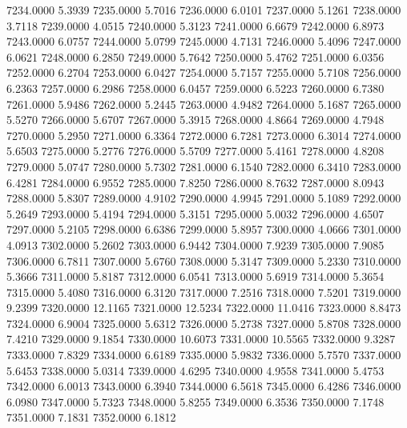 7234.0000      5.3939
7235.0000      5.7016
7236.0000      6.0101
7237.0000      5.1261
7238.0000      3.7118
7239.0000      4.0515
7240.0000      5.3123
7241.0000      6.6679
7242.0000      6.8973
7243.0000      6.0757
7244.0000      5.0799
7245.0000      4.7131
7246.0000      5.4096
7247.0000      6.0621
7248.0000      6.2850
7249.0000      5.7642
7250.0000      5.4762
7251.0000      6.0356
7252.0000      6.2704
7253.0000      6.0427
7254.0000      5.7157
7255.0000      5.7108
7256.0000      6.2363
7257.0000      6.2986
7258.0000      6.0457
7259.0000      6.5223
7260.0000      6.7380
7261.0000      5.9486
7262.0000      5.2445
7263.0000      4.9482
7264.0000      5.1687
7265.0000      5.5270
7266.0000      5.6707
7267.0000      5.3915
7268.0000      4.8664
7269.0000      4.7948
7270.0000      5.2950
7271.0000      6.3364
7272.0000      6.7281
7273.0000      6.3014
7274.0000      5.6503
7275.0000      5.2776
7276.0000      5.5709
7277.0000      5.4161
7278.0000      4.8208
7279.0000      5.0747
7280.0000      5.7302
7281.0000      6.1540
7282.0000      6.3410
7283.0000      6.4281
7284.0000      6.9552
7285.0000      7.8250
7286.0000      8.7632
7287.0000      8.0943
7288.0000      5.8307
7289.0000      4.9102
7290.0000      4.9945
7291.0000      5.1089
7292.0000      5.2649
7293.0000      5.4194
7294.0000      5.3151
7295.0000      5.0032
7296.0000      4.6507
7297.0000      5.2105
7298.0000      6.6386
7299.0000      5.8957
7300.0000      4.0666
7301.0000      4.0913
7302.0000      5.2602
7303.0000      6.9442
7304.0000      7.9239
7305.0000      7.9085
7306.0000      6.7811
7307.0000      5.6760
7308.0000      5.3147
7309.0000      5.2330
7310.0000      5.3666
7311.0000      5.8187
7312.0000      6.0541
7313.0000      5.6919
7314.0000      5.3654
7315.0000      5.4080
7316.0000      6.3120
7317.0000      7.2516
7318.0000      7.5201
7319.0000      9.2399
7320.0000     12.1165
7321.0000     12.5234
7322.0000     11.0416
7323.0000      8.8473
7324.0000      6.9004
7325.0000      5.6312
7326.0000      5.2738
7327.0000      5.8708
7328.0000      7.4210
7329.0000      9.1854
7330.0000     10.6073
7331.0000     10.5565
7332.0000      9.3287
7333.0000      7.8329
7334.0000      6.6189
7335.0000      5.9832
7336.0000      5.7570
7337.0000      5.6453
7338.0000      5.0314
7339.0000      4.6295
7340.0000      4.9558
7341.0000      5.4753
7342.0000      6.0013
7343.0000      6.3940
7344.0000      6.5618
7345.0000      6.4286
7346.0000      6.0980
7347.0000      5.7323
7348.0000      5.8255
7349.0000      6.3536
7350.0000      7.1748
7351.0000      7.1831
7352.0000      6.1812
